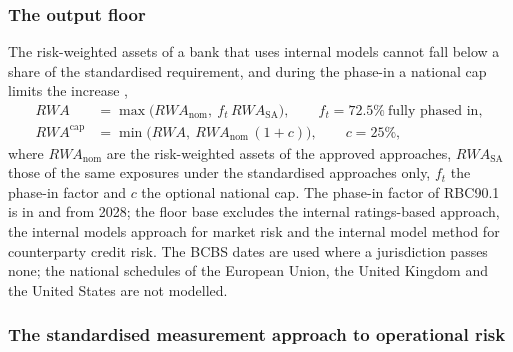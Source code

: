 \subsubsection{The output floor}

The risk-weighted assets of a bank that uses internal models cannot fall below a share of the standardised requirement, and during the phase-in a national cap limits the increase \citep{ccr:rbc20,ccr:rbc90},
\begin{equation}
\begin{aligned}
RWA&=\max\big(RWA_{\mathrm{nom}},\ f_t\,RWA_{\mathrm{SA}}\big),\qquad f_t=72.5\%\ \text{fully phased in},\\
RWA^{\mathrm{cap}}&=\min\big(RWA,\ RWA_{\mathrm{nom}}\,(1+c)\big),\qquad c=25\%,
\end{aligned}
\label{eq:ccr-floor}
\end{equation}
where $RWA_{\mathrm{nom}}$ are the risk-weighted assets of the approved approaches, $RWA_{\mathrm{SA}}$ those of the same exposures under the standardised approaches only, $f_t$ the phase-in factor and $c$ the optional national cap. The phase-in factor of RBC90.1 is \ccrPhaseInFirst{} in \ccrPhaseInFirstYear{} and \ccrPhaseInLast{} from 2028; the floor base excludes the internal ratings-based approach, the internal
models approach for market risk and the internal model method for counterparty credit risk. The BCBS dates are used where a jurisdiction passes none; the national schedules of the European Union, the United Kingdom and the United States are not modelled.

\subsubsection{The standardised measurement approach to operational risk}

